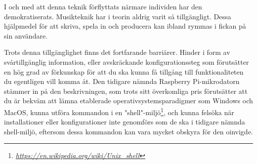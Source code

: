 \documentclass{article}
\begin{document}
I och med att denna teknik förflyttats närmare individen har den demokratiserats. Musikteknik har i teorin
aldrig varit så tillgängligt. Dessa hjälpmedel för att skriva, spela in och producera kan ibland rymmas i
fickan på sin användare.

Trots denna tillgänglighet finns det fortfarande barriärer. Hinder i form av svårtillgänglig information,
eller avskräckande konfigurationssteg som förutsätter en hög grad av förkunskap för att du ska kunna få
tillgång till funktionaliteten du egentligen vill komma åt. Den tidigare nämnda Raspberry Pi-mikrodatorn
stämmer in på den beskrivningen, som trots sitt överkomliga pris förutsätter att du är bekväm att lämna
etablerade operativsystemsparadigmer som Windows och MacOS, kunna utföra kommandon i en
"shell"-miljö\footnote{\emph{\url{https://en.wikipedia.org/wiki/Unix\_shell}}}, och kunna felsöka när
installationer eller konfigurationer inte genomförs som de ska i tidigare nämnda shell-miljö, eftersom dessa
kommandon kan vara mycket obskyra för den oinvigde.
	
\end{document}
